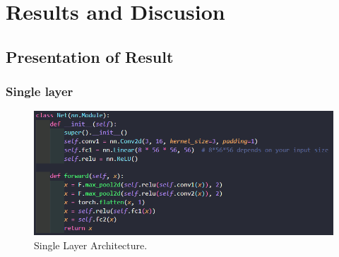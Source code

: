 \documentclass[conference]{IEEEtran}
\begin{document}
\section{Results and Discusion}

\subsection{Presentation of Result}

\subsubsection{Single layer}

\begin{figure}[h]
    \centering
    \includegraphics[width=\linewidth]{single layer arc.png}
    \caption{Single Layer Architecture.}
    \label{figSl}
\end{figure}
\end{document}
